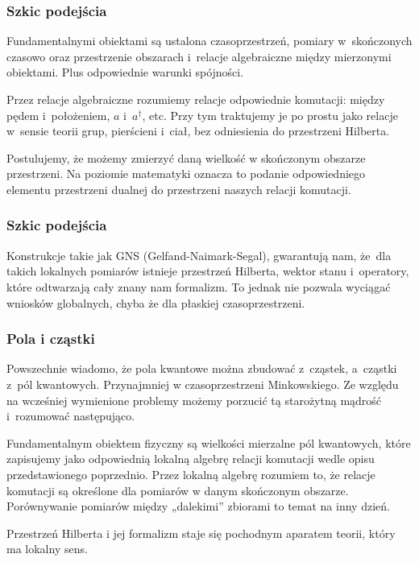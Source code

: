 \documentclass[10pt,t]{beamer}
\begin{document}
\begin{frame}
  \frametitle{Szkic podejścia}


  Fundamentalnymi obiektami są ustalona czasoprzestrzeń, pomiary
  w~skończonych czasowo oraz przestrzenie obszarach i~relacje
  algebraiczne między mierzonymi obiektami. Plus odpowiednie warunki
  spójności.

  Przez relacje algebraiczne rozumiemy relacje odpowiednie komutacji:
  między pędem i~położeniem, $a$ i~$a^{ \dagger }$, etc. Przy tym
  traktujemy je po prostu jako relacje w~sensie teorii grup,
  pierścieni i~ciał, bez odniesienia do przestrzeni Hilberta.

  Postulujemy, że możemy zmierzyć daną wielkość w skończonym obszarze
  przestrzeni. Na poziomie matematyki oznacza to podanie odpowiedniego
  elementu przestrzeni dualnej do przestrzeni naszych relacji
  komutacji.

\end{frame}





\begin{frame}
  \frametitle{Szkic podejścia}


  Konstrukcje takie jak GNS (Gelfand-Naimark-Segal), gwarantują nam,
  że~dla takich lokalnych pomiarów istnieje przestrzeń Hilberta,
  wektor stanu i~operatory, które odtwarzają cały znany nam formalizm.
  To jednak nie pozwala wyciągać wniosków globalnych, chyba że dla
  płaskiej czasoprzestrzeni.

\end{frame}





\begin{frame}
  \frametitle{Pola i cząstki}


  Powszechnie wiadomo, że pola kwantowe można zbudować z~cząstek,
  a~cząstki z~pól kwantowych. Przynajmniej w czasoprzestrzeni
  Minkowskiego. Ze względu na wcześniej wymienione problemy możemy
  porzucić tą starożytną mądrość i~rozumować następująco.

  Fundamentalnym obiektem fizyczny są wielkości mierzalne pól
  kwantowych, które zapisujemy jako odpowiednią lokalną algebrę
  relacji komutacji wedle opisu przedstawionego poprzednio. Przez
  lokalną algebrę rozumiem to, że relacje komutacji są określone dla
  pomiarów w danym skończonym obszarze. Porównywanie pomiarów między
  „dalekimi” zbiorami to temat na inny dzień.

  Przestrzeń Hilberta i jej formalizm staje się pochodnym aparatem
  teorii, który ma lokalny sens.

\end{frame}
\end{document}
